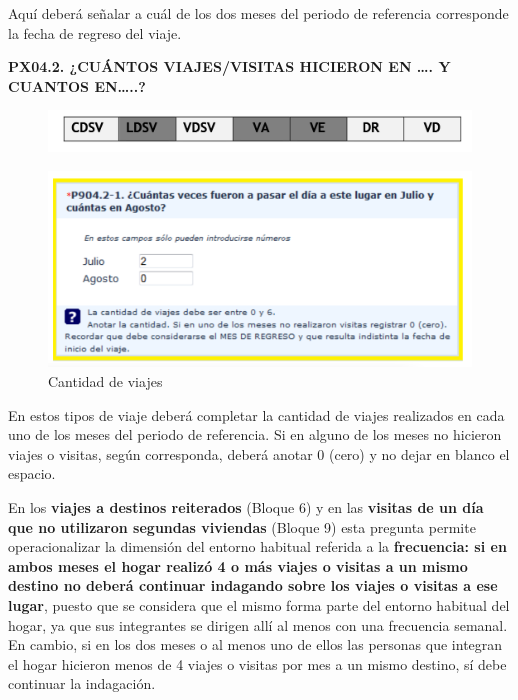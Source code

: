 \documentclass[
  openany]{book}
\begin{document}
Aquí deberá señalar a cuál de los dos meses del periodo de referencia corresponde la fecha de regreso del viaje.

\textbf{PX04.2. ¿CUÁNTOS VIAJES/VISITAS HICIERON EN \ldots. Y CUANTOS EN\ldots..?}

\begin{figure}

{\centering \includegraphics[width=1\linewidth]{imagenes/figura6-87} 

}

\end{figure}

\begin{figure}

{\centering \includegraphics[width=1\linewidth]{imagenes/figura6-88} 

}

\caption{Cantidad de viajes}\label{fig:cantidaddevi}
\end{figure}

En estos tipos de viaje deberá completar la cantidad de viajes realizados en cada uno de los meses del periodo de referencia. Si en alguno de los meses no hicieron viajes o visitas, según corresponda, deberá anotar 0 (cero) y no dejar en blanco el espacio.

En los \textbf{viajes a destinos reiterados} (Bloque 6) y en las \textbf{visitas de un día que no utilizaron segundas viviendas} (Bloque 9) esta pregunta permite operacionalizar la dimensión del entorno habitual referida a la \textbf{frecuencia: si en ambos meses el hogar realizó 4 o más viajes o visitas a un mismo destino no deberá continuar indagando sobre los viajes o visitas a ese lugar}, puesto que se considera que el mismo forma parte del entorno habitual del hogar, ya que sus integrantes se dirigen allí al menos con una frecuencia semanal. En cambio, si en los dos meses o al menos uno de ellos las personas que integran el hogar hicieron menos de 4 viajes o visitas por mes a un mismo destino, sí debe continuar la indagación.
\end{document}
